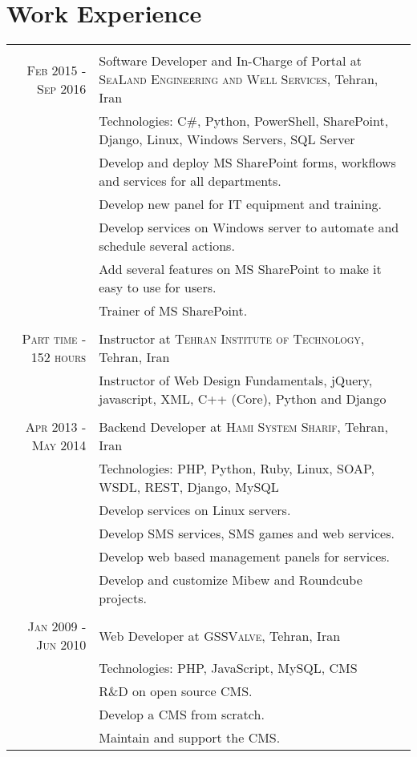 \documentclass[a4paper,11pt]{article}
\begin{document}
\section{Work Experience}
\begin{tabular}{r|p{11cm}}

    \multicolumn{2}{c}{}\\
    \textsc{Feb 2015 - Sep 2016}
    & Software Developer and In-Charge of Portal at \textsc{SeaLand Engineering and Well Services},
    Tehran, Iran\\
    &\footnotesize{Technologies: C\#, Python, PowerShell, SharePoint, Django, Linux,  Windows Servers, SQL Server}\\
    &\footnotesize{Develop and deploy MS SharePoint forms, workflows and services for all departments.}\\
    &\footnotesize{Develop new panel for IT equipment and training.}\\
    &\footnotesize{Develop services on Windows server to automate and schedule several actions.}\\
    &\footnotesize{Add several features on MS SharePoint to make it easy to use for users.}\\
    &\footnotesize{Trainer of MS SharePoint.}\\

    \multicolumn{2}{c}{}\\
    \textsc{Part time - 152 hours}
    & Instructor at \textsc{Tehran Institute of Technology},
    Tehran, Iran\\
    &\footnotesize{Instructor of Web Design Fundamentals, jQuery, javascript, XML, C++ (Core), Python and Django}\\

    \multicolumn{2}{c}{}\\
    \textsc{Apr 2013 - May 2014}
    & Backend Developer at \textsc{Hami System Sharif},
    Tehran, Iran\\
    &\footnotesize{Technologies: PHP, Python, Ruby, Linux, SOAP, WSDL, REST, Django, MySQL}\\
    &\footnotesize{Develop services on Linux servers.}\\
    &\footnotesize{Develop SMS services, SMS games and web services.}\\
    &\footnotesize{Develop web based management panels for services.}\\
    &\footnotesize{Develop and customize Mibew and Roundcube projects.}\\

    \multicolumn{2}{c}{}\\
    \textsc{Jan 2009 - Jun 2010}
    & Web Developer at \textsc{GSSValve},
    Tehran, Iran\\
    &\footnotesize{Technologies: PHP, JavaScript, MySQL, CMS}\\
    &\footnotesize{R\&D on open source CMS.}\\
    &\footnotesize{Develop a CMS from scratch.}\\
    &\footnotesize{Maintain and support the CMS.}

\end{tabular}\\
\end{document}
